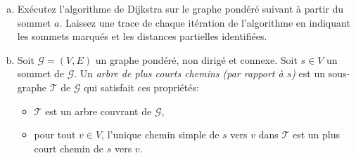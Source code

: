 \documentclass{article}
\renewcommand{\G}{\mathcal{G}}                   %
\newcommand{\T}{\mathcal{T}}                     %
\begin{document}
\pagebreak

\begin{question}
  \begin{enumerate}[(a)]
  \setlength\itemsep{15pt}

  \item Exécutez  l'algorithme de Dijkstra
    sur le graphe pondéré suivant à partir du sommet $a$. Laissez une
    trace de chaque itération de l'algorithme en indiquant les sommets
    marqués et les distances partielles
    identifiées.\bigskip\label{itm:dijkstra}

    \begin{center}
    \end{center}

  \item Soit $\G = (V, E)$ un graphe pondéré, non dirigé et
    connexe. Soit $s \in V$ un sommet de $\G$. Un \emph{arbre de plus
      courts chemins (par rapport à $s$)} est un sous-graphe $\T$ de
    $\G$ qui satisfait ces propriétés:\medskip
    
    \begin{itemize}
      \setlength\itemsep{10pt}
      
    \item $\T$ est un arbre couvrant de $\G$,
      
    \item pour tout $v \in V$, l'unique chemin simple de $s$ vers $v$
      dans $\T$ est un plus court chemin de $s$ vers $v$.
    \end{itemize}\bigskip
    

\end{enumerate}
\end{question}
\end{document}
